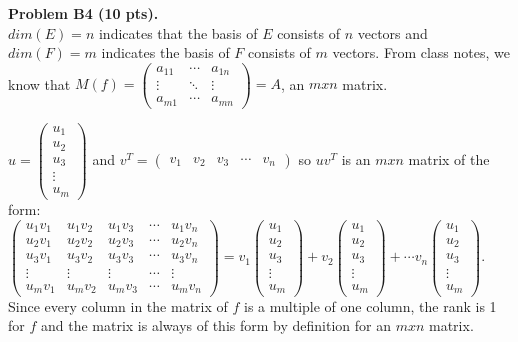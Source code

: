 \documentclass[12pt]{article}
\begin{document}
\vspace {0.25cm}\noindent
{\bf Problem B4 (10 pts).} \\
$dim(E)=n$ indicates that the basis of $E$ consists of $n$ vectors
and $dim(F)=m$ indicates the basis of $F$ consists of $m$ vectors.
From class notes, we know that $M(f)=\begin{pmatrix}a_{11} & \cdots & a_{1n}\\
\vdots & \ddots & \vdots\\
a_{m1} & \cdots & a_{mn}
\end{pmatrix}=A$, an $mxn$ matrix.

$u=\begin{pmatrix}u_{1}\\
u_{2}\\
u_{3}\\
\vdots\\
u_{m}
\end{pmatrix}$ and $v^{T}=\begin{pmatrix}v_{1} & v_{2} & v_{3} & \cdots & v_{n}\end{pmatrix}$
so $uv^{T}$ is an $mxn$ matrix of the form: $\begin{pmatrix}u_{1}v_{1} & u_{1}v_{2} & u_{1}v_{3} & \cdots & u_{1}v_{n}\\
u_{2}v_{1} & u_{2}v_{2} & u_{2}v_{3} & \cdots & u_{2}v_{n}\\
u_{3}v_{1} & u_{3}v_{2} & u_{3}v_{3} & \cdots & u_{3}v_{n}\\
\vdots & \vdots & \vdots & \cdots & \vdots\\
u_{m}v_{1} & u_{m}v_{2} & u_{m}v_{3} & \cdots & u_{m}v_{n}
\end{pmatrix}=v_{1}\begin{pmatrix}u_{1}\\
u_{2}\\
u_{3}\\
\vdots\\
u_{m}
\end{pmatrix}+v_{2}\begin{pmatrix}u_{1}\\
u_{2}\\
u_{3}\\
\vdots\\
u_{m}
\end{pmatrix}+\cdots v_{n}\begin{pmatrix}u_{1}\\
u_{2}\\
u_{3}\\
\vdots\\
u_{m}
\end{pmatrix}$. Since every column in the matrix of $f$ is a multiple of one column,
the rank is 1 for $f$ and the matrix is always of this form by definition
for an $mxn$ matrix.
\end{document}

